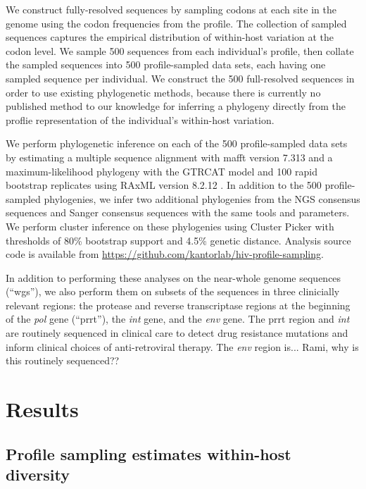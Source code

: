 \documentclass[letterpaper]{article}
\begin{document}
We construct fully-resolved sequences by sampling codons at each site in the genome using the codon frequencies from the profile. The collection of sampled sequences captures the empirical distribution of within-host variation at the codon level. We sample 500 sequences from each individual's profile, then collate the sampled sequences into 500 profile-sampled data sets, each having one sampled sequence per individual. We construct the 500 full-resolved sequences in order to use existing phylogenetic methods, because there is currently no published method to our knowledge for inferring a phylogeny directly from the proflie representation of the individual's within-host variation.

We perform phylogenetic inference on each of the 500 profile-sampled data sets by estimating a multiple sequence alignment with mafft version 7.313 \parencite{katoh} and a maximum-likelihood phylogeny with the GTRCAT model and 100 rapid bootstrap replicates using RAxML version 8.2.12 \parencite{stamatakis}. In addition to the 500 profile-sampled phylogenies, we infer two additional phylogenies from the NGS consensus sequences and Sanger consensus sequences with the same tools and parameters. We perform cluster inference on these phylogenies using Cluster Picker \parencite{ragonnet-cronin} with thresholds of 80\% bootstrap support and 4.5\% genetic distance. Analysis source code is available from \url{https://github.com/kantorlab/hiv-profile-sampling}.

In addition to performing these analyses on the near-whole genome sequences (``wgs''), we also perform them on subsets of the sequences in three clinicially relevant regions: the protease and reverse transcriptase regions at the beginning of the \emph{pol} gene (``prrt''), the \emph{int} gene, and the \emph{env} gene. The prrt region and \emph{int} are routinely sequenced in clinical care to detect drug resistance mutations and inform clinical choices of anti-retroviral therapy. The \emph{env} region is... Rami, why is this routinely sequenced??

\section*{Results}

\subsection*{Profile sampling estimates within-host diversity}
\end{document}
